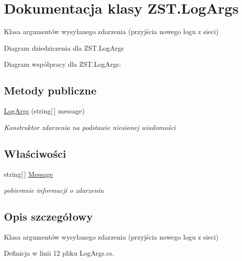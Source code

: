 \hypertarget{class_z_s_t_1_1_log_args}{}\section{Dokumentacja klasy Z\+S\+T.\+Log\+Args}
\label{class_z_s_t_1_1_log_args}


Klasa argumentów wysyłanego zdarzenia (przyjścia nowego logu z sieci)  




Diagram dziedziczenia dla Z\+S\+T.\+Log\+Args


Diagram współpracy dla Z\+S\+T.\+Log\+Args\+:
\subsection*{Metody publiczne}
\begin{DoxyCompactItemize}
\item 
\hyperlink{class_z_s_t_1_1_log_args_abbdad34b1e99cad66cdef74c97772980}{Log\+Args} (string\mbox{[}$\,$\mbox{]} message)
\begin{DoxyCompactList}\small\item\em Konstruktor zdarzenia na podstawie niesionej wiadomości \end{DoxyCompactList}\end{DoxyCompactItemize}
\subsection*{Właściwości}
\begin{DoxyCompactItemize}
\item 
string\mbox{[}$\,$\mbox{]} \hyperlink{class_z_s_t_1_1_log_args_a135eb4cae47cdbbbb4b54bbb783f9540}{Message}
\begin{DoxyCompactList}\small\item\em pobieranie informacji o zdarzeniu \end{DoxyCompactList}\end{DoxyCompactItemize}


\subsection{Opis szczegółowy}
Klasa argumentów wysyłanego zdarzenia (przyjścia nowego logu z sieci) 



Definicja w linii 12 pliku Log\+Args.\+cs.



